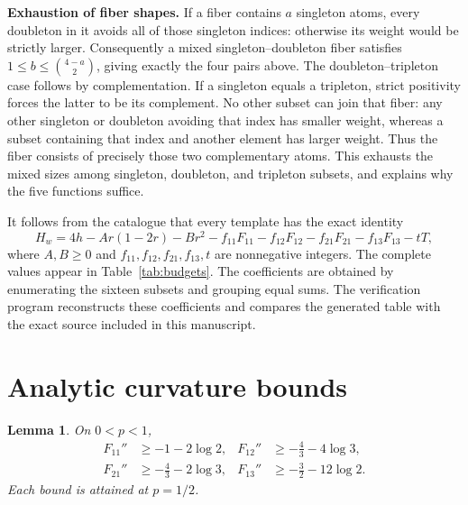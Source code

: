 \documentclass[11pt,a4paper]{article}
\newtheorem{lemma}[theorem]{Lemma}
\begin{document}
\textbf{Exhaustion of fiber shapes.}
If a fiber contains \(a\) singleton atoms, every doubleton in it avoids
all of those singleton indices: otherwise its weight would be strictly
larger. Consequently a mixed singleton--doubleton fiber satisfies
\(1\le b\le\binom{4-a}{2}\), giving exactly the four pairs above.
The doubleton--tripleton case follows by complementation.
If a singleton equals a tripleton, strict positivity forces the latter
to be its complement. No other subset can join that fiber: any other
singleton or doubleton avoiding that index has smaller weight, whereas
a subset containing that index and another element has larger weight.
Thus the fiber consists of precisely those two complementary atoms.
This exhausts the mixed sizes among singleton, doubleton, and tripleton
subsets, and explains why the five functions suffice.

It follows from the catalogue that every template has the exact identity
\begin{equation}\label{eq:loss}
 H_w=4h-Ar(1-2r)-Br^2
       -f_{11}F_{11}-f_{12}F_{12}-f_{21}F_{21}-f_{13}F_{13}-tT,
\end{equation}
where \(A,B\ge0\) and \(f_{11},f_{12},f_{21},f_{13},t\) are
nonnegative integers. The complete values appear in
Table~\ref{tab:budgets}. The coefficients are obtained by enumerating
the sixteen subsets and grouping equal sums. The verification program
reconstructs these coefficients and compares the generated table with
the exact source included in this manuscript.

\section{Analytic curvature bounds}
\begin{lemma}\label{lem:F}
On \(0<p<1\),
\begin{align*}
 F_{11}''&\ge-1-2\log2,&
 F_{12}''&\ge-\tfrac43-4\log3,\\
 F_{21}''&\ge-\tfrac43-2\log3,&
 F_{13}''&\ge-\tfrac32-12\log2.
\end{align*}
Each bound is attained at \(p=1/2\).
\end{lemma}
\end{document}
